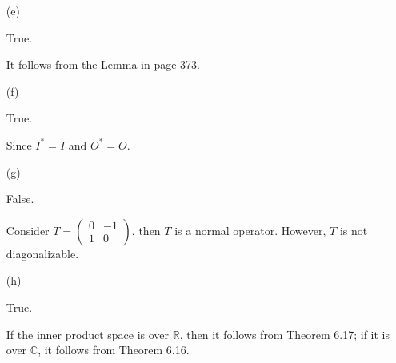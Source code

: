 \begin{Exercise}
\begin{enumerate}[(a)]
\item[(e)]
\begin{answer}
True.
\end{answer}
\begin{solution}
It follows from the Lemma in page 373.
\end{solution}

\item[(f)]
\begin{answer}
True.
\end{answer}
\begin{solution}
Since $I^* = I$ and $O^* = O$.
\end{solution}

\item[(g)]
\begin{answer}
False.
\end{answer}
\begin{solution}
Consider $T = \begin{pmatrix}
0 & -1 \\
1 & 0
\end{pmatrix}$, then $T$ is a normal operator. However, $T$ is not diagonalizable.
\end{solution}

\item[(h)]
\begin{answer}
True.
\end{answer}
\begin{solution}
If the inner product space is over $\mathbb{R}$, then it follows from Theorem 6.17; if it is over $\mathbb{C}$, it follows from Theorem 6.16.
\end{solution}

\end{enumerate}
\end{Exercise}